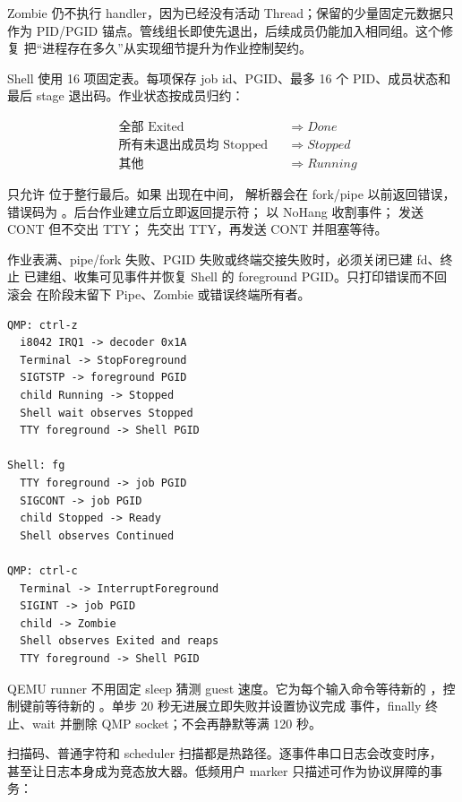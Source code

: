 Zombie 仍不执行 handler，因为已经没有活动 Thread；保留的少量固定元数据只
作为 PID/PGID 锚点。管线组长即使先退出，后续成员仍能加入相同组。这个修复
把“进程存在多久”从实现细节提升为作业控制契约。

Shell 使用 16 项固定表。每项保存 job id、PGID、最多 16 个 PID、成员状态和
最后 stage 退出码。作业状态按成员归约：

\[
\begin{aligned}
  &\text{全部 Exited} &&\Rightarrow Done\\
  &\text{所有未退出成员均 Stopped} &&\Rightarrow Stopped\\
  &\text{其他} &&\Rightarrow Running
\end{aligned}
\]

 只允许 \code{\&} 位于整行最后。如果 \code{\&} 出现在中间，
解析器会在 fork/pipe 以前返回错误，错误码为
。后台作业建立后立即返回提示符；
 以 NoHang 收割事件； 发送 CONT 但不交出 TTY；
 先交出 TTY，再发送 CONT 并阻塞等待。

\begin{failurebox}
作业表满、pipe/fork 失败、PGID 失败或终端交接失败时，必须关闭已建 fd、终止
已建组、收集可见事件并恢复 Shell 的 foreground PGID。只打印错误而不回滚会
在阶段末留下 Pipe、Zombie 或错误终端所有者。
\end{failurebox}

\par
\begin{lstlisting}
QMP: ctrl-z
  i8042 IRQ1 -> decoder 0x1A
  Terminal -> StopForeground
  SIGTSTP -> foreground PGID
  child Running -> Stopped
  Shell wait observes Stopped
  TTY foreground -> Shell PGID

Shell: fg
  TTY foreground -> job PGID
  SIGCONT -> job PGID
  child Stopped -> Ready
  Shell observes Continued

QMP: ctrl-c
  Terminal -> InterruptForeground
  SIGINT -> job PGID
  child -> Zombie
  Shell observes Exited and reaps
  TTY foreground -> Shell PGID
\end{lstlisting}

QEMU runner 不用固定 sleep 猜测 guest 速度。它为每个输入命令等待新的
，控制键前等待新的
。单步 20 秒无进展立即失败并设置协议完成
事件，finally 终止、wait 并删除 QMP socket；不会再静默等满 120 秒。

扫描码、普通字符和 scheduler 扫描都是热路径。逐事件串口日志会改变时序，
甚至让日志本身成为竞态放大器。低频用户 marker 只描述可作为协议屏障的事务：

